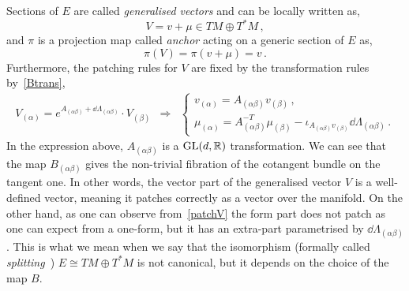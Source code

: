 \documentclass[debug]{phd}
\begin{document}
					Sections of $E$ are called \emph{generalised vectors} and can be locally written as,
							\begin{equation}
								V = v + \mu \in TM \oplus T^*M\, , 
							\end{equation}
					and $\pi$ is a projection map called \emph{anchor} acting on a generic section of $E$ as,
							\begin{equation}
								\pi (V) = \pi (v+ \mu) = v \, .
							\end{equation}
					Furthermore, the patching rules for $V$ are fixed by the transformation rules by~\eqref{Btrans},
							\begin{equation}\label{patchV}
								\begin{array}{ccc}
								V_{(\alpha)} = e^{A_{(\alpha\beta)} + \dd \Lambda_{(\alpha\beta)}} \cdot V_{(\beta)} & \Longrightarrow &
									\begin{cases}
										v_{(\alpha)} = A_{(\alpha\beta)} v_{(\beta)} \, ,\\[1,5mm]
										\mu_{(\alpha)} = A^{-T}_{(\alpha\beta)} \mu_{(\beta)} - \iota_{A_{(\alpha\beta)} v_{(\beta)}} \dd \Lambda_{(\alpha\beta)} \, .
									\end{cases}
								\end{array}
							\end{equation}
					In the expression above, $A_{(\alpha\beta)}$ is a $\mathrm{GL}(d,\mathbb{R})$ transformation.
					We can see that the map $B_{(\alpha\beta)}$ gives the non-trivial fibration of the cotangent bundle on the tangent one.
					In other words, the vector part of the generalised vector $V$ is a well-defined vector, meaning it patches correctly as a vector over the manifold.
					On the other hand, as one can observe from~\eqref{patchV} the form part does not patch as one can expect from a one-form, but it has an extra-part parametrised by $\dd \Lambda_{(\alpha\beta)}$.
					This is what we mean when we say that the isomorphism (formally called \emph{splitting}~\cite{Hatcher}) $E \cong TM \oplus T^*M$ is not canonical, but it depends on the choice of the map $B$.
										
\end{document}
